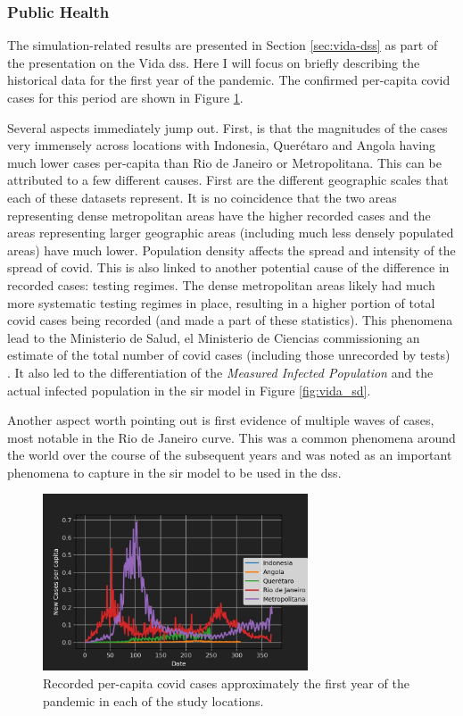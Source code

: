 \subsubsection{Public Health}

The simulation-related results are presented in Section \ref{sec:vida-dss} as part of the presentation on the Vida \ac{dss}. Here I will focus on briefly describing the historical data for the first year of the pandemic. The confirmed per-capita \ac{covid} cases for this period are shown in Figure \ref{fig:combined-cases}. 

Several aspects immediately jump out. First, is that the magnitudes of the cases very immensely across locations with Indonesia, Querétaro and Angola having much lower cases per-capita than Rio de Janeiro or Metropolitana. This can be attributed to a few different causes. First are the different geographic scales that each of these datasets represent. It is no coincidence that the two areas representing dense metropolitan areas have the higher recorded cases and the areas representing larger geographic areas (including much less densely populated areas) have much lower. Population density affects the spread and intensity of the spread of \ac{covid}. This is also linked to another potential cause of the difference in recorded cases: testing regimes. The dense metropolitan areas likely had much more systematic testing regimes in place, resulting in a higher portion of total \ac{covid} cases being recorded (and made a part of these statistics). This phenomena lead to the Ministerio de Salud, el Ministerio de Ciencias commissioning an estimate of the total number of \ac{covid} cases (including those unrecorded by tests) \cite{icovidDatosCOVID19OutputProducto532020}. It also led to the differentiation of the \textit{Measured Infected Population} and the actual infected population in the \ac{sir} model in Figure \ref{fig:vida_sd}.

Another aspect worth pointing out is first evidence of multiple waves of cases, most notable in the Rio de Janeiro curve. This was a common phenomena around the world over the course of the subsequent years and was noted as an important phenomena to capture in the \ac{sir} model to be used in the \ac{dss}. 

\begin{figure}[!htb]
\centering
\includegraphics[width=0.7\textwidth]{Figures/chap5/combined-cases.jpg}
\caption[COVID-19 Cases Over Time]{Recorded per-capita \ac{covid} cases approximately the first year of the pandemic in each of the study locations.}
\label{fig:combined-cases}
\end{figure}

